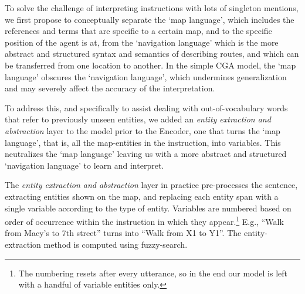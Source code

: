 \documentclass[11pt,a4paper]{article}
\begin{document}
To solve the challenge of interpreting  instructions with lots of singleton mentions, we first propose to conceptually separate the  \enquote*{map language}, which includes the references and terms that are specific to a certain map, and to the specific position of the agent is at,
from the \enquote*{navigation language} %
which is the more abstract and  structured syntax and semantics of describing routes, and which can be transferred from one location to another. In the simple CGA model,  the \enquote*{map language} obscures the \enquote*{navigation language}, which undermines generalization and may severely affect the accuracy of the interpretation. 

To address this, and specifically to assist dealing with out-of-vocabulary words that refer to previously unseen entities, we added an {\em entity extraction and abstraction} layer to the model prior to the Encoder, one that turns the \enquote*{map language}, that is, all the map-entities in the instruction, into variables. This neutralizes the \enquote*{map language} leaving us with a more abstract and structured  \enquote*{navigation language} to learn and interpret.


The {\em entity extraction and abstraction} layer in practice pre-processes the sentence, extracting entities shown on the map, and replacing each entity span with a single variable according to the type of entity. Variables are numbered based on order of occurrence within the instruction in which they appear.\footnote{The numbering resets after every utterance, so in the end our model is left with a handful of variable entities only.}  E.g., \enquote{Walk from Macy's to 7th street} turns into \enquote{Walk from X1 to Y1}. The entity-extraction method is computed using fuzzy-search.



 \begin{figure*}[ht]

  \center
{}
         
        \caption
        {An example of a {\em world-state representation} during navigation. The agent is denoted by a \enquote*{star} symbol. The first part of the world-state is the current state (\enquote*{current BOW position}) and the second is the direction ahead (\enquote*{forward BOW position}). When the agent is in \enquote*{Cherry Tavern} (swapped for \enquote*{X1}) the current position representation indicates it by a \enquote*{1} in the first bit. When the agent reaches her final destination - \enquote*{Mother of Pearl} (swapped for \enquote*{X2}), it is represented in the current position representation by a \enquote*{1} in the second bit.} 
        \label{fig:world_state}
    \end{figure*}
    
\end{document}
